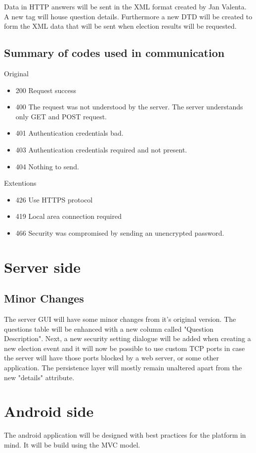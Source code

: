 \documentclass[11pt,twoside,a4paper]{book}
\begin{document}
Data in HTTP answers will be sent in the XML format created by Jan Valenta. A new tag will house question details. Furthermore a new DTD will be created to form the XML data that will be sent when election results will be requested.

\subsection{Summary of codes used in communication}
Original\cite{bakalarkaJV}
\begin{itemize}
\item 200 Request success
\item 400 The request was not understood by the server. The server understands only GET and POST request.
\item 401 Authentication credentials bad.
\item 403 Authentication credentials required and not present.
\item 404 Nothing to send.\\
\end{itemize}

Extentions
\begin{itemize}
\item 426 Use HTTPS protocol
\item 419 Local area connection required
\item 466 Security was compromised by sending an unencrypted password.
\end{itemize}
\section{Server side}
\subsection{Minor Changes}
The server GUI will have some minor changes from it's original version. The questions table will be enhanced with a new column called "Question Description". Next, a new security setting dialogue will be added when creating a new election event and it will now be possible to use custom TCP ports in case the server will  have those ports blocked by a web server, or some other application. The persistence layer will mostly remain unaltered apart from the new "details" attribute.


\section{Android side}
The android application will be designed with best practices for the platform in mind. It will be build using the MVC model\cite{whatIsMVC}.
\end{document}
